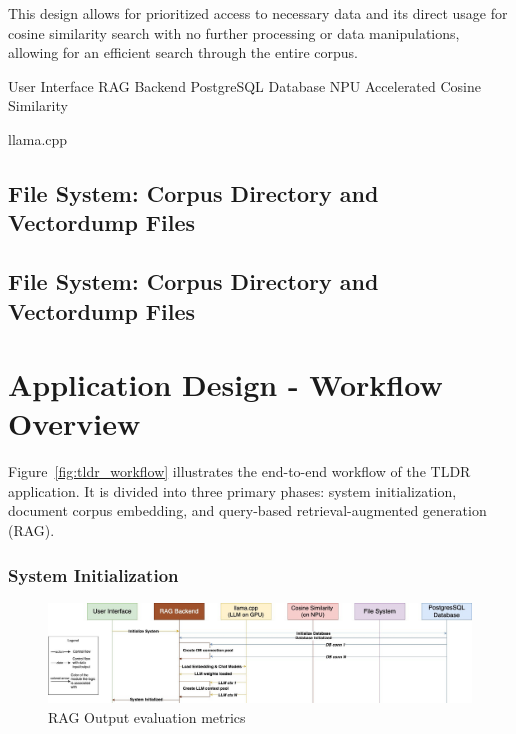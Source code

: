This design allows for prioritized access to necessary data and its direct usage for cosine similarity search with no further processing or data manipulations, allowing for an efficient search through the entire corpus.




User Interface RAG Backend  PostgreSQL Database NPU Accelerated Cosine Similarity  {llama.cpp
\subsection{File System: Corpus Directory and Vectordump Files}
\label{subsec:FSandVectordump_files}


\subsection{File System: Corpus Directory and Vectordump Files}
\label{subsec:FSandVectordump_files}



\section{Application Design - Workflow Overview}
\label{subsec:TldrWorkflowOverview}

Figure~\ref{fig:tldr_workflow} illustrates the end-to-end workflow of the TLDR application. It is divided into three primary phases: system initialization, document corpus embedding, and query-based retrieval-augmented generation (RAG).

\subsubsection{System Initialization}

\begin{figure}[H]
    \centering
    \includegraphics[width=1.0\linewidth]{images/tldr-app-worklfow-pt1.jpg}
    \caption{RAG Output evaluation metrics ~\cite{cardenas2023rag}}
    \label{fig:autoregressive_decoding}
\end{figure}


}
